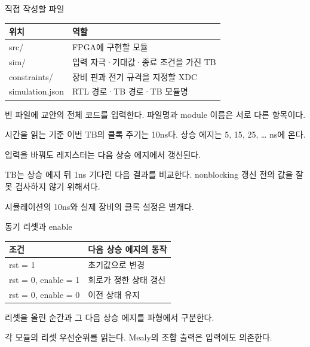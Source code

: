 \begin{frame}{직접 작성할 파일}
\small
\begin{center}\renewcommand{\arraystretch}{1.55}\begin{tabular}{ll}
위치 & 역할\\\hline
src/ & FPGA에 구현할 모듈\\
sim/ & 입력 자극·기대값·종료 조건을 가진 TB\\
constraints/ & 장비 핀과 전기 규격을 지정할 XDC\\
simulation.json & RTL 경로·TB 경로·TB 모듈명\\
\end{tabular}\end{center}빈 파일에 교안의 전체 코드를 입력한다. 파일명과 module 이름은 서로 다른 항목이다.\par
\end{frame}

\begin{frame}[label=clock]{시간을 읽는 기준}
\small
이번 TB의 클록 주기는 10ns다. 상승 에지는 5, 15, 25, … ns에 온다.\par\vspace{0.26cm}입력을 바꿔도 레지스터는 다음 상승 에지에서 갱신된다.\par\vspace{0.26cm}TB는 상승 에지 뒤 1ns 기다린 다음 결과를 비교한다. nonblocking 갱신 전의 값을 잘못 검사하지 않기 위해서다.\par\vspace{0.26cm}시뮬레이션의 10ns와 실제 장비의 클록 설정은 별개다.\par
\end{frame}

\begin{frame}{동기 리셋과 enable}
\small
\begin{center}\renewcommand{\arraystretch}{1.55}\begin{tabular}{ll}
조건 & 다음 상승 에지의 동작\\\hline
rst = 1 & 초기값으로 변경\\
rst = 0, enable = 1 & 회로가 정한 상태 갱신\\
rst = 0, enable = 0 & 이전 상태 유지\\
\end{tabular}\end{center}리셋을 올린 순간과 그 다음 상승 에지를 파형에서 구분한다.\par\vspace{0.26cm}각 모듈의 리셋 우선순위를 읽는다. Mealy의 조합 출력은 입력에도 의존한다.\par
\end{frame}

